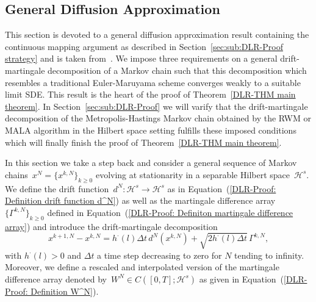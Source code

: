\subsection{General Diffusion Approximation}
\label{sec:sub:DLR-General diffusion approximation}

This section is devoted to a general diffusion approximation result containing the continuous mapping argument as described in Section~\ref{sec:sub:DLR-Proof strategy} and is taken from~\autocite[Section 3.2]{Pillai2012}. We impose three requirements on a general drift-martingale decomposition of a Markov chain such that this decomposition which resembles a traditional Euler-Maruyama scheme converges weakly to a suitable limit SDE. This result is the heart of the proof of Theorem~\ref{DLR-THM main theorem}. In Section~\ref{sec:sub:DLR-Proof} we will varify that the drift-martingale decomposition of the Metropolis-Hastings Markov chain obtained by the RWM or MALA algorithm in the Hilbert space setting fulfills these imposed conditions which  will finally finish the proof of Theorem~\ref{DLR-THM main theorem}.

In this section we take a step back and consider a general sequence of Markov chains~$x^N = \{ x^{k,N} \}_{k\geq0}$ evolving at stationarity in a separable Hilbert space~$\mathcal{H}^s$. We define the drift function~$d^N: \mathcal{H}^s \to \mathcal{H}^s$ as in Equation~(\ref{DLR-Proof: Definition drift function d^N}) as well as the martingale difference array~$\{\Gamma^{k,N}\}_{k\geq0}$ defined in Equation~(\ref{DLR-Proof: Definiton martingale difference array}) and introduce the drift-martingale decomposition
\begin{equation}
  \label{DLR-Proof: drift-martingale decomposition for general diffusion approximation}
 x^{k+1,N} - x^{k,N} = h^{\cdot}(l) \Delta t \, d^N(x^{k,N}) + \sqrt{2 h^{\cdot}(l) \Delta t} \, \Gamma^{k,N},
\end{equation}
with $h^{\cdot}(l)>0$ and $\Delta t$ a time step decreasing to zero for $N$ tending to infinity. Moreover, we define a rescaled and interpolated version of the martingale difference array denoted by~$W^N \in C([0,T];\mathcal{H}^s)$ as given in Equation~(\ref{DLR-Proof: Definition W^N}).


